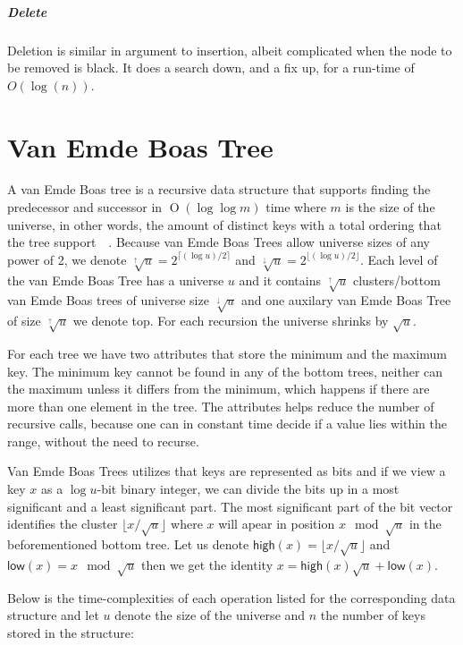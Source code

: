 \documentclass[oneside,11pt,openright]{report}
\newcommand{\BigO}[1]{\ensuremath{\operatorname{O}\left(#1\right)}}
\newcommand{\HIGH}{\textsf{high}}
\newcommand{\LOW}{\textsf{low}}
\newcommand{\HIGHER}{\sqrt[\uparrow]{u}}
\newcommand{\LOWER}{\sqrt[\downarrow]{u}}
\begin{document}
\paragraph{Delete} Deletion is similar in argument to insertion,
albeit complicated when the node to be removed is black. It does a
search down, and a fix up, for a run-time of $O(\log(n))$.


\chapter{Van Emde Boas Tree}

A van Emde Boas tree is a recursive data structure that supports
finding the predecessor and successor in \BigO{\log \log m} time where
$m$ is the size of the universe, in other words, the amount of
distinct keys with a total ordering that the tree
support~\cite[p. 545]{ITA09}~\cite{VEB04}. Because van Emde Boas Trees
allow universe sizes of any power of 2, we denote $\HIGHER =
2^{\lceil{(\log u)/2}\rceil}$ and $\LOWER = 2^{\lfloor{(\log
    u)/2}\rfloor}$.  Each level of the van Emde Boas Tree has a
universe $u$ and it contains $\HIGHER$ clusters/bottom van Emde Boas
trees of universe size $\LOWER$ and one auxilary van Emde Boas Tree of
size $\HIGHER$ we denote top.  For each recursion the universe shrinks
by $\sqrt{u}$.

For each tree we have two attributes that store the minimum and the
maximum key. The minimum key cannot be found in any of the bottom
trees, neither can the maximum unless it differs from the minimum,
which happens if there are more than one element in the tree. The
attributes helps reduce the number of recursive calls, because one can
in constant time decide if a value lies within the range, without the
need to recurse.

Van Emde Boas Trees utilizes that keys are represented as bits and if
we view a key $x$ as a $\log u$-bit binary integer, we can divide the
bits up in a most significant and a least significant part. The most
significant part of the bit vector identifies the cluster
$\lfloor{x/\sqrt{u}}\rfloor$ where $x$ will apear in position $x \mod
\sqrt{u}$ in the beforementioned bottom tree. Let us denote $\HIGH(x)
= \lfloor{x/\sqrt{u}}\rfloor$ and $\LOW(x) = x \mod \sqrt{u}$ then we
get the identity $x = \HIGH(x) \sqrt{u} + \LOW(x)$.

Below is the time-complexities of each operation listed for the
corresponding data structure and let $u$ denote the size of the
universe and $n$ the number of keys stored in the structure:
\end{document}
